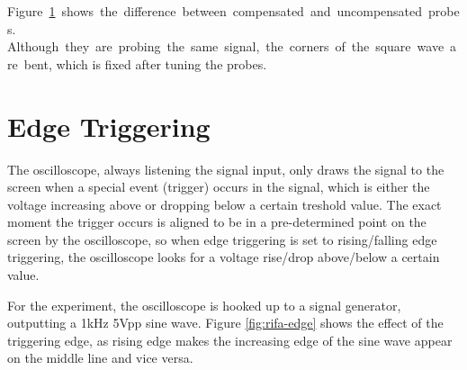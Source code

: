 \documentclass[a4paper, 12pt]{article}
\begin{document}
\newpage

\mbox{Figure \ref{fig:comp-signal} shows the difference between compensated and uncompensated probes.}
\mbox{Although they are probing the same signal, the corners of the square wave are bent}, which is fixed after tuning the probes.

\begin{figure}[!h]
	\centering
	\hfill
	\caption{}
	\label{fig:comp-signal}
\end{figure}

\vspace{-1.5cm}
\section{Edge Triggering}

The oscilloscope, always listening the signal input, only draws the signal to the screen when a special event (trigger) occurs in the signal, which is either the voltage increasing above or dropping below a certain treshold value.
The exact moment the trigger occurs is aligned to be in a pre-determined point on the screen by the oscilloscope, so when edge triggering is set to rising/falling edge triggering, the oscilloscope looks for a voltage rise/drop above/below a certain value.

For the experiment, the oscilloscope is hooked up to a signal generator, outputting a 1kHz 5Vpp sine wave.
Figure \ref{fig:rifa-edge} shows the effect of the triggering edge, as rising edge makes the increasing edge of the sine wave appear on the middle line and vice versa.
\end{document}
